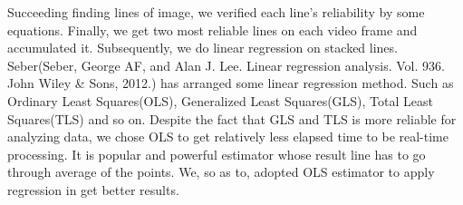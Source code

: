 Succeeding finding lines of image, we verified each line's reliability by some equations. \newline
Finally, we get two most reliable lines on each video frame and accumulated it. Subsequently, we do linear regression on stacked lines. Seber(Seber, George AF, and Alan J. Lee. Linear regression analysis. Vol. 936. John Wiley \& Sons, 2012.) has arranged some linear regression method. Such as Ordinary Least Squares(OLS), Generalized Least Squares(GLS), Total Least Squares(TLS) and so on. Despite the fact that GLS and TLS is more reliable for analyzing data, we chose OLS to get relatively less elapsed time to be real-time processing. It is popular and powerful estimator whose result line has to go through average of the points. We, so as to, adopted OLS estimator to apply regression in get better results.